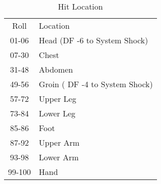 
\begin{table}
	\begin{tabular}{cl}
	Roll			  &  Location \\
	01-06		   &  Head (DF -6 to System Shock) \\
	07-30		   &  Chest \\
	31-48		   &  Abdomen \\
	49-56		   &  Groin ( DF -4 to System Shock) \\
	57-72		   &  Upper Leg \\
	73-84 			&  Lower Leg \\
	85-86		  		  &  Foot \\
	87-92		   &  Upper Arm \\
	93-98		   &  Lower Arm \\
	99-100			&  Hand \\	 
    \end{tabular}
    \caption{Hit Location}
\end{table}


